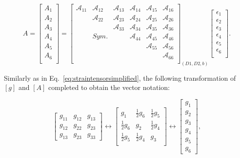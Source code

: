   
\begin{equation}
\label{eq:Atosigma}
A=\begin{bmatrix}
A_{1} \\
A_{2} \\
A_{3} \\
A_{4} \\
A_{5} \\
A_{6} \\
\end{bmatrix}=
\begin{bmatrix}
\mathcal{A}_{11} & \mathcal{A}_{12} & \mathcal{A}_{13} & \mathcal{A}_{14}
& \mathcal{A}_{15} & \mathcal{A}_{16} \\
& \mathcal{A}_{22} & \mathcal{A}_{23} & \mathcal{A}_{24} & \mathcal{A}_{25} & \mathcal{A}_{26} \\
& & \mathcal{A}_{33} & \mathcal{A}_{34} & \mathcal{A}_{35} & \mathcal{A}_{36} \\
& Sym. & & \mathcal{A}_{44} & \mathcal{A}_{45} & \mathcal{A}_{46} \\
& & & & \mathcal{A}_{55} & \mathcal{A}_{56} \\
& & & & & \mathcal{A}_{66} \\
\end{bmatrix}_{(D1,D2,b)}
\begin{bmatrix}
\epsilon_{1} \\
\epsilon_{2} \\
\epsilon_{3} \\
\epsilon_{4} \\
\epsilon_{5} \\
\epsilon_{6} \\
\end{bmatrix}.
\end{equation} 

Similarly as in Eq.~\ref{eq:straintensorsimplified}, the following transformation of $[g]$ and $[A]$ completed to obtain the vector notation:

\begin{equation}
\label{eq:gsimplified}
\begin{bmatrix}
g_{11} & g_{12} & g_{13} \\ 
g_{12} & g_{22}  & g_{23}\\ 
g_{13} & g_{23} & g_{33}
\end{bmatrix} \leftrightarrow 
\begin{bmatrix}
g_{1} & \frac{1}{2}g_{6} & \frac{1}{2}g_{5} \\ 
\frac{1}{2}g_{6} & g_{2}  & \frac{1}{2}g_{4}\\ 
\frac{1}{2}g_{5} & \frac{1}{2}g_{4} & g_{3} \\
\end{bmatrix} \leftrightarrow 
\begin{bmatrix}
g_{1}\\ 
g_{2}\\ 
g_{3}\\ 
g_{4}\\ 
g_{5}\\ 
g_{6}
\end{bmatrix},
\end{equation}

